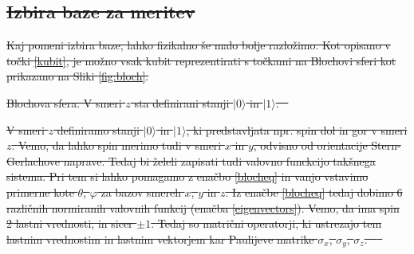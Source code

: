 \documentclass[12pt]{article}
\providecommand{\DIFdel}[1]{{\protect\color{red}\sout{#1}}}                      %
\providecommand{\DIFdelFL}[1]{\DIFdel{#1}} %
\begin{document}
\subsection{\DIFdel{Izbira baze za meritev}}
\addtocounter{subsection}{-1}%

\DIFdel{Kaj pomeni izbira baze, lahko fizikalno še malo bolje razložimo. Kot opisano v točki \ref{kubit}, je možno vsak kubit reprezentirati s točkami na Blochovi sferi kot prikazano na Sliki \ref{fig:bloch}. }%

{%
\DIFdelFL{Blochova sfera. V smeri $z$ sta definirani stanji $| 0 \rangle$ in $| 1 \rangle$. \mbox{%
\cite{BlochSphere2023}}\hskip0pt%
}}

\DIFdel{V smeri $z$ definiramo stanji $| 0 \rangle$ in $| 1 \rangle$, ki predstavljata npr. spin dol in gor v smeri $z$. Vemo, da lahko spin merimo tudi v smeri $x$ in $y$, odvisno od orientacije Stern-Gerlachove naprave. Tedaj bi želeli zapisati tudi valovno funckcijo takšnega sistema. Pri tem si lahko pomagamo z enačbo \ref{blocheq} in vanjo vstavimo primerne kote $\theta$, $\varphi$ za bazov smereh $x$, $y$ in $z$. Iz enačbe \ref{blocheq} tedaj dobimo 6 različnih normiranih valovnih funkcij (enačba \ref{eigenvectors}). Vemo, da ima spin 2 lastni vrednosti, in sicer $\pm 1$. Tedaj so matrični operatorji, ki ustrezajo tem lastnim vrednostim in lastnim vektorjem kar Paulijeve matrike $\sigma_x$, $\sigma_y$, $\sigma_z$. \mbox{%
\cite{PauliMatrices2023}
}\hskip0pt%
}%
\end{document}
